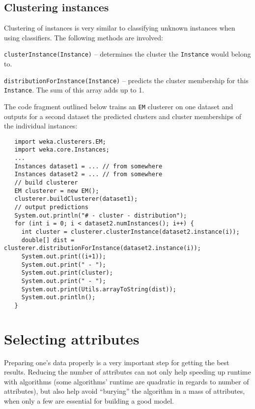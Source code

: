 \subsection{Clustering instances}
Clustering of instances is very similar to classifying unknown instances when
using classifiers. The following methods are involved:
\begin{tight_itemize}
	\item \texttt{clusterInstance(Instance)} -- determines the cluster the
\texttt{Instance} would belong to.
	\item \texttt{distributionForInstance(Instance)} -- predicts the cluster
membership for this \texttt{Instance}. The sum of this array adds up to 1.
\end{tight_itemize}
The code fragment outlined below trains an \texttt{EM} clusterer on one
dataset and outputs for a second dataset the predicted clusters and cluster
memberships of the individual instances:
\begin{verbatim}
   import weka.clusterers.EM;
   import weka.core.Instances;
   ...
   Instances dataset1 = ... // from somewhere
   Instances dataset2 = ... // from somewhere
   // build clusterer
   EM clusterer = new EM();
   clusterer.buildClusterer(dataset1);
   // output predictions
   System.out.println("# - cluster - distribution");
   for (int i = 0; i < dataset2.numInstances(); i++) {
     int cluster = clusterer.clusterInstance(dataset2.instance(i));
     double[] dist = clusterer.distributionForInstance(dataset2.instance(i));
     System.out.print((i+1));
     System.out.print(" - ");
     System.out.print(cluster);
     System.out.print(" - ");
     System.out.print(Utils.arrayToString(dist));
     System.out.println();
   }
\end{verbatim}

\newpage

\section{Selecting attributes}
\label{api_selecting_attributes}
Preparing one's data properly is a very important step for getting the best
results. Reducing the number of attributes can not only help speeding up
runtime with algorithms (some algorithms' runtime are quadratic in regards to
number of attributes), but also help avoid ``burying'' the algorithm in a
mass of attributes, when only a few are essential for building a good model. \\

